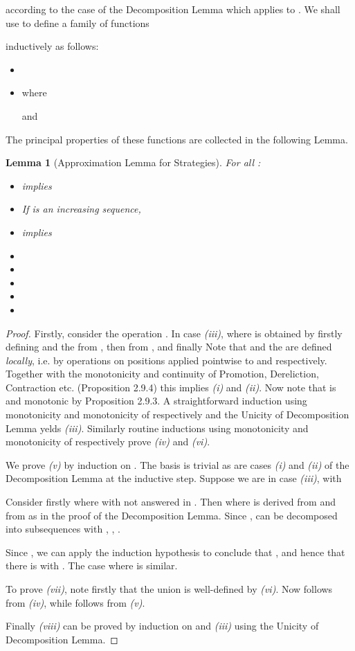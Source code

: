 \documentclass[11pt]{article}
\newtheorem{lemma}[theorem]{Lemma}
\begin{document}
according to the case of the Decomposition Lemma which applies to
. We shall use  to define a family of
functions

inductively as follows:
\begin{itemize}
\item 
\item 
where

and


\end{itemize}
The principal properties of these functions are collected in the
following Lemma.

\begin{lemma}[Approximation Lemma for Strategies]\label{lemm1}
For all :
\begin{itemize}
\item[(i)]  implies 
\item[(ii)] If  is an increasing
  sequence,

\item[(iii)]  implies 
\item[(iv)] 
\item[(v)] 
\item[(vi)] 
\item[(vii)] 
\item[(viii)] 
\end{itemize}
\end{lemma}
\begin{proof} Firstly, consider the operation . In
case {\it (iii)}, where
  is obtained by firstly defining
 and the  from , then  from
, and finally  Note that  and the  are defined
{\em
  locally}, i.e. by operations on positions applied pointwise to
 and  respectively. Together with the
monotonicity and continuity of Promotion, Dereliction,
Contraction etc. (Proposition 2.9.4) this implies {\it (i)} and
{\it (ii)}. Now note that  is  and
 monotonic by Proposition 2.9.3. A straightforward
induction using monotonicity and monotonicity
of  respectively and the Unicity of Decomposition Lemma
yelds {\it (iii)}. Similarly routine inductions using
monotonicity and monotonicity of 
respectively prove {\it (iv)} and {\it (vi)}.

We prove {\it (v)} by induction on . The basis is trivial as are cases
{\it (i)} and {\it (ii)} of the Decomposition Lemma at the inductive step. Suppose
we are in case {\it (iii)}, with

Consider firstly  where  with  not
answered in . Then  where  is derived
from  and  from  as in the proof of the
Decomposition Lemma. Since
,  can be
decomposed into subsequences  with
, , .

Since , we can apply the induction hypothesis to
conclude that , and hence
that there is  with . The case where  is similar.

To prove {\it (vii)}, note firstly that the union  is well-defined by {\it (vi)}. Now  follows from {\it (iv)}, while  follows from {\it (v)}.

Finally {\it (viii)} can be proved by induction   on  and {\it
  (iii)} using the Unicity of Decomposition Lemma.
\end{proof}
\end{document}
